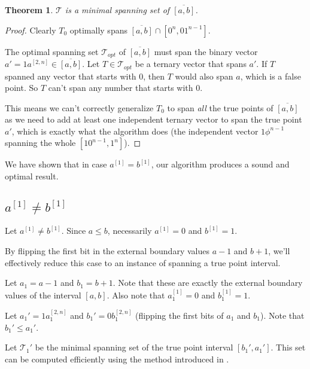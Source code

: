 \documentclass{article}
\theoremstyle{plain}
\newtheorem{theorem}{Theorem}[subsection]
\theoremstyle{definition}
\newcommand{\interval}[2]{[#1, #2]}
\newcommand{\compl}[1]{\overline{#1}}
\newcommand{\finterval}[2]{\compl{\interval{#1}{#2}}}
\newcommand{\bit}[2]{#1^{[#2]}}
\newcommand{\bits}[3]{#1^{\interval{#2}{#3}}}
\begin{document}
\begin{theorem}
$\mathcal{T}$ is a minimal spanning set of $\finterval{a}{b}$.
\end{theorem}
\begin{proof}
Clearly $T_0$ optimally spans $\finterval{a}{b} \cap \interval{0^n}{0 1^{n-1}}$.

The optimal spanning set $\mathcal{T}_{opt}$ of $\finterval{a}{b}$
must span the binary vector $a' = 1 \bits{a}{2}{n} \in \finterval{a}{b}$.
Let $T \in \mathcal{T}_{opt}$ be a ternary vector that spans $a'$.
If $T$ spanned any vector that starts with $0$,
then $T$ would also span $a$,
which is a false point.
So $T$ can't span any number that starts with $0$.

This means we can't correctly generalize $T_0$
to span \emph{all} the true points of $\finterval{a}{b}$
as we need to add at least one independent ternary vector
to span the true point $a'$,
which is exactly what the algorithm does
(the independent vector $1 \phi^{n-1}$
spanning the whole $\interval{1 0^{n-1}}{1^n}$).
\end{proof}

We have shown that in case $\bit{a}{1} = \bit{b}{1}$,
our algorithm produces a sound and optimal result.

\subsection{\texorpdfstring{$\bit{a}{1} \neq \bit{b}{1}$}{a[1] != b[1]}}
Let $\bit{a}{1} \neq \bit{b}{1}$.
Since $a \leq b$, necessarily $\bit{a}{1} = 0$ and $\bit{b}{1} = 1$.


By flipping the first bit in the external boundary values
$a - 1$ and $b + 1$,
we'll effectively reduce this case
to an instance of spanning a true point interval.

Let $a_1 = a - 1$ and $b_1 = b + 1$.
Note that these are exactly the external boundary values
of the interval $\interval{a}{b}$.
Also note that $\bit{a_1}{1} = 0$ and $\bit{b_1}{1} = 1$.

Let $a_1' = 1 \bits{a_1}{2}{n}$
and $b_1' = 0 \bits{b_1}{2}{n}$
(flipping the first bits of $a_1$ and $b_1$).
Note that $b_1' \leq a_1'$.

Let $\mathcal{T}_1'$ be the minimal spanning set
of the true point interval $\interval{b_1'}{a_1'}$.
This set can be computed efficiently
using the method introduced in \cite{Schieber2005154}.
\end{document}
